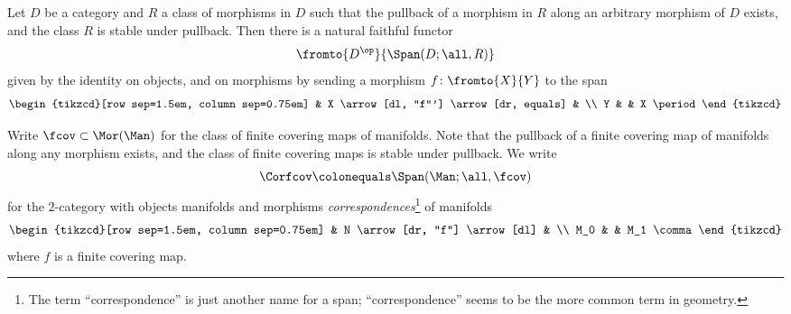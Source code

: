 \begin{observation}
	Let $ D $ be a category and $ R $ a class of morphisms in $ D $ such that the pullback of a morphism in $ R $ along an arbitrary morphism of $ D $ exists, and the class $ R $ is stable under pullback.
	Then there is a natural faithful functor
	\begin{equation*}
		\fromto{D^{\op}}{\Span(D;\all,R)}
	\end{equation*}
	given by the identity on objects, and on morphisms by sending a morphism $ f \colon \fromto{X}{Y} $ to the span
	\begin{equation*}
		\begin{tikzcd}[row sep=1.5em, column sep=0.75em]
			& X \arrow[dl, "f"'] \arrow[dr, equals] & \\
			Y & & X \period
		\end{tikzcd}
	\end{equation*}
\end{observation}

\begin{example}
	Write $ \fcov \subset \Mor(\Man) $ for the class of finite covering maps of manifolds.
	Note that the pullback of a finite covering map of manifolds along any morphism exists, and the class of finite covering maps is stable under pullback.
	We write
	\begin{equation*}
		\Corfcov \colonequals \Span(\Man;\all,\fcov)
	\end{equation*}
	for the $ 2 $-category with objects manifolds and morphisms \textit{correspondences}\footnote{The term
	``correspondence'' is just another name for a span; ``correspondence'' seems to be the more common term in geometry.} of manifolds 
	\begin{equation*}
		\begin{tikzcd}[row sep=1.5em, column sep=0.75em]
			& N \arrow[dr, "f"] \arrow[dl] & \\
			M_0 & & M_1 \comma
		\end{tikzcd}
	\end{equation*}
	where $ f $ is a finite covering map.
\end{example}

